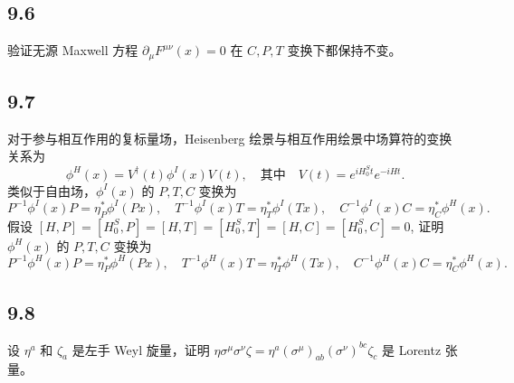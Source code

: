 \newpage
\subsection{9.6}
验证无源 Maxwell 方程 $\partial_\mu F^{\mu\nu}(x) = 0$ 在 $C, P, T$ 变换下都保持不变。

\newpage
\subsection{9.7}
对于参与相互作用的复标量场，Heisenberg 绘景与相互作用绘景中场算符的变换关系为
$$\phi^H(x) = V^\dagger(t)\phi^I(x)V(t), \quad 其中 \quad V(t) = e^{iH_0^S t}e^{-iHt}. $$
类似于自由场，$\phi^I(x)$ 的 $P, T, C$ 变换为
$$P^{-1}\phi^I(x)P = \eta^*_P \phi^I(Px), \quad T^{-1}\phi^I(x)T = \eta^*_T \phi^I(Tx), \quad C^{-1}\phi^I(x)C = \eta^*_C \phi^H(x). \tag{9.575}$$
假设 $[H, P] = [H_0^S, P] = [H, T] = [H_0^S, T] = [H, C] = [H_0^S, C] = 0$, 证明 $\phi^H(x)$ 的 $P, T, C$ 变换为
$$P^{-1}\phi^H(x)P = \eta^*_P \phi^H(Px), \quad T^{-1}\phi^H(x)T = \eta^*_T \phi^H(Tx), \quad C^{-1}\phi^H(x)C = \eta^*_C \phi^H(x). \tag{9.576}$$

\newpage
\subsection{9.8}
设 $\eta^a$ 和 $\zeta_a$ 是左手 Weyl 旋量，证明 $\eta\sigma^\mu\sigma^\nu\zeta = \eta^a(\sigma^\mu)_{ab}(\sigma^\nu)^{bc}\zeta_c$ 是 Lorentz 张量。

